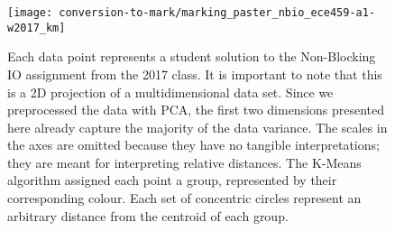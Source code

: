 \begin{figure}
\texttt{[image: conversion-to-mark/marking\_paster\_nbio\_ece459-a1-w2017\_km]}
\caption[K-Means Clustering]{Each data point represents a student solution to the Non-Blocking IO assignment from the 2017 class. It is important to note that this is a 2D projection of a multidimensional data set. Since we preprocessed the data with PCA, the first two dimensions presented here already capture the majority of the data variance. The scales in the axes are omitted because they have no tangible interpretations; they are meant for interpreting relative distances. The K-Means algorithm assigned each point a group, represented by their corresponding colour. Each set of concentric circles represent an arbitrary distance from the centroid of each group.}
\label{fig:ctm-km}
\end{figure}
